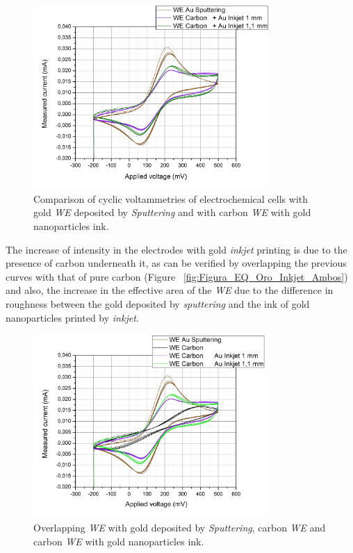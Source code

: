 \begin{figure}[H]
  \centering
    \includegraphics[width=0.8\textwidth]{Figures/Figura_EQ_Sputt_2-Inkjet}
  \caption{Comparison of cyclic voltammetries of electrochemical cells with gold \emph{WE} deposited by \textit{Sputtering} and with carbon \emph{WE} with gold nanoparticles ink.}
  \label{fig:Figura_EQ_Sputt_2-Inkjet}
\end{figure}

The increase of intensity in the electrodes with gold \textit{inkjet} printing is due to the presence of carbon underneath it, as can be verified by overlapping the previous curves with that of pure carbon (Figure ~\ref{fig:Figura_EQ_Oro_Inkjet_Ambos}) and also, the increase in the effective area of the \emph{WE} due to the difference in roughness between the gold deposited by \textit{sputtering}  and the ink of gold nanoparticles printed by \textit{inkjet}.

\begin{figure}[H]
  \centering
    \includegraphics[width=0.8\textwidth]{Figures/Figura_EQ_Sptt_AuInkjet_Carbono_Valox}
  \caption{Overlapping \emph{WE} with gold deposited by \textit{Sputtering}, carbon \emph{WE} and carbon \emph{WE} with gold nanoparticles ink.}
  \label{fig:Figura_EQ_Sptt_AuInkjet_Carbono_Valox}
\end{figure}

